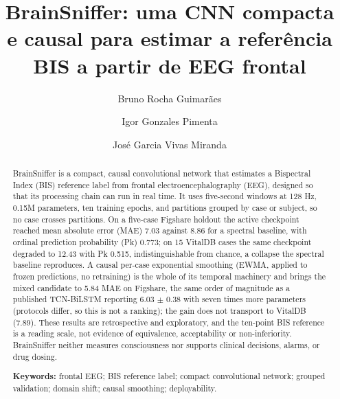 \documentclass[12pt]{article}
\title{BrainSniffer: uma CNN compacta e causal para estimar a referência BIS a partir de EEG frontal}
\author{Bruno Rocha Guimarães\inst{1}\and Igor Gonzales Pimenta\inst{1}\and José Garcia Vivas Miranda\inst{1}}
\begin{document}
\maketitle

\begin{abstract}
BrainSniffer is a compact, causal convolutional network that estimates a Bispectral Index (BIS) reference label from frontal electroencephalography (EEG), designed so that its processing chain can run in real time. It uses five-second windows at 128 Hz, 0.15M parameters, ten training epochs, and partitions grouped by case or subject, so no case crosses partitions. On a five-case Figshare holdout the active checkpoint reached mean absolute error (MAE) 7.03 against 8.86 for a spectral baseline, with ordinal prediction probability (Pk) 0.773; on 15 VitalDB cases the same checkpoint degraded to 12.43 with Pk 0.515, indistinguishable from chance, a collapse the spectral baseline reproduces. A causal per-case exponential smoothing (EWMA, applied to frozen predictions, no retraining) is the whole of its temporal machinery and brings the mixed candidate to 5.84 MAE on Figshare, the same order of magnitude as a published TCN-BiLSTM reporting 6.03 $\pm$ 0.38 with seven times more parameters (protocols differ, so this is not a ranking); the gain does not transport to VitalDB (7.89). These results are retrospective and exploratory, and the ten-point BIS reference is a reading scale, not evidence of equivalence, acceptability or non-inferiority. BrainSniffer neither measures consciousness nor supports clinical decisions, alarms, or drug dosing.

\textbf{Keywords:} frontal EEG; BIS reference label; compact convolutional network; grouped validation; domain shift; causal smoothing; deployability.
\end{abstract}
\end{document}
